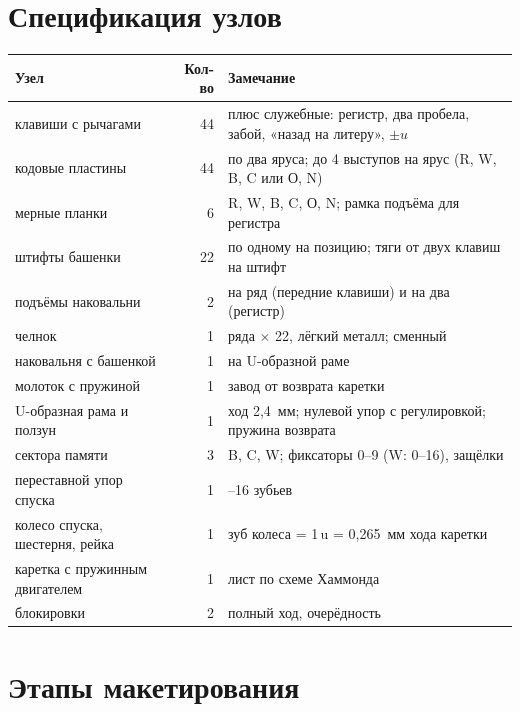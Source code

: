 \section{Спецификация узлов}
\label{sec:spec}

\begin{center}\small
\begin{tabularx}{\linewidth}{@{}>{\raggedright}p{50mm}r>{\raggedright\arraybackslash}X@{}}
\toprule
Узел & Кол-во & Замечание \\
\midrule
клавиши с рычагами & 44 & плюс служебные: регистр, два пробела, забой, «назад на литеру», $\pm u$ \\
кодовые пластины & 44 & по два яруса; до 4 выступов на ярус (R, W, B, C или О, N) \\
мерные планки & 6 & R, W, B, C, О, N; рамка подъёма для регистра \\
штифты башенки & 22 & по одному на позицию; тяги от двух клавиш на штифт \\
подъёмы наковальни & 2 & на ряд (передние клавиши) и на два (регистр) \\
челнок & 1 & 4 ряда $\times$ 22, лёгкий металл; сменный \\
наковальня с башенкой & 1 & на U-образной раме \\
молоток с пружиной & 1 & завод от возврата каретки \\
U-образная рама и ползун & 1 & ход 2,4~мм; нулевой упор с регулировкой; пружина возврата \\
сектора памяти & 3 & B, C, W; фиксаторы 0--9 (W: 0--16), защёлки \\
переставной упор спуска & 1 & 4--16 зубьев \\
колесо спуска, шестерня, рейка & 1 & зуб колеса = 1\,u = 0,265~мм хода каретки \\
каретка с пружинным двигателем & 1 & лист по схеме Хаммонда \\
блокировки & 2 & полный ход, очерёдность \\
\bottomrule
\end{tabularx}
\end{center}

\section{Этапы макетирования}
\label{sec:stages}

